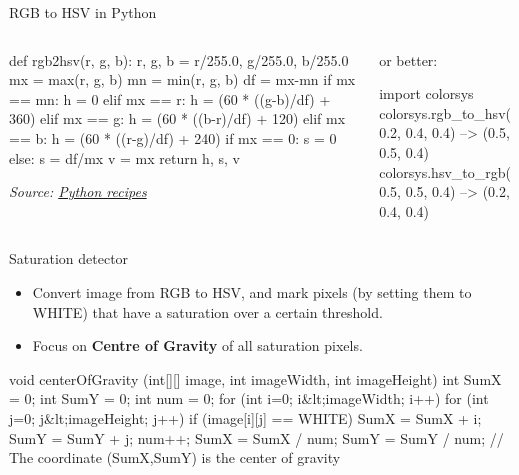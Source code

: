 \documentclass[compress]{beamer}
\newcommand{\source}[2]{{\tiny\it Source: \href{#1}{#2}}}
\begin{document}
\begin{frame}[fragile]{RGB to HSV in Python}

    \begin{columns}
        \begin{column}{0.5\linewidth}
\begin{pythoncode}
def rgb2hsv(r, g, b):
    r, g, b = r/255.0, g/255.0, b/255.0
    mx = max(r, g, b)
    mn = min(r, g, b)
    df = mx-mn
    if mx == mn:
        h = 0
    elif mx == r:
        h = (60 * ((g-b)/df) + 360) %
    elif mx == g:
        h = (60 * ((b-r)/df) + 120) %
    elif mx == b:
        h = (60 * ((r-g)/df) + 240) %
    if mx == 0:
        s = 0
    else:
        s = df/mx
    v = mx
    return h, s, v
\end{pythoncode}
\source{http://code.activestate.com/recipes/576919-python-rgb-and-hsv-conversion/}{Python recipes}
            
        \end{column}
        \begin{column}{0.5\linewidth}
            \vspace{4cm}

or better:

\begin{pythoncode}
import colorsys
colorsys.rgb_to_hsv(0.2, 0.4, 0.4)
--> (0.5, 0.5, 0.4)
colorsys.hsv_to_rgb(0.5, 0.5, 0.4)
--> (0.2, 0.4, 0.4)
\end{pythoncode}

        \end{column}
    \end{columns}


\end{frame}

\begin{frame}[fragile]{Saturation detector}

\begin{itemize}

\item
  Convert image from RGB to HSV, and mark pixels (by setting them to
  WHITE) that have a saturation over a certain threshold.
\item
  Focus on \textbf{Centre of Gravity} of all saturation pixels.
\end{itemize}

\begin{matlabcode}
void centerOfGravity (int[][] image, int imageWidth,
        int imageHeight)
{
    int SumX = 0;
    int SumY = 0;
    int num = 0;
    for (int i=0; i&lt;imageWidth; i++)
    {
        for (int j=0; j&lt;imageHeight; j++)
        {
            if (image[i][j] == WHITE)
            {
                SumX = SumX + i;
                SumY = SumY + j;
                num++;
            }
        }
    }
    SumX = SumX / num;
    SumY = SumY / num;
    // The coordinate (SumX,SumY) is the center of gravity
}
\end{matlabcode}

\end{frame}
\end{document}
